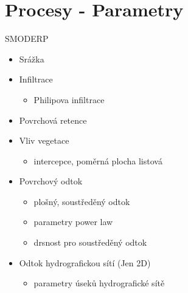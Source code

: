 \section{Procesy - Parametry}
\begin{frame}{SMODERP}
\begin{itemize}\itemsep=1em
        \item Srážka
        \item Infiltrace 
            \begin{itemize}
                \item Philipova infiltrace
            \end{itemize}
        \item Povrchová retence
        \item Vliv vegetace
            \begin{itemize}
                \item intercepce, poměrná plocha listová
            \end{itemize}
        \item Povrchový odtok
            \begin{itemize}
                \item plošný, soustředěný odtok
                \item parametry power law 
                \item drsnost pro soustředěný odtok
            \end{itemize}
        \item Odtok hydrografickou sítí (Jen 2D)
            \begin{itemize}
                \item parametry úseků hydrografické sítě
            \end{itemize}
\end{itemize}
\end{frame}
